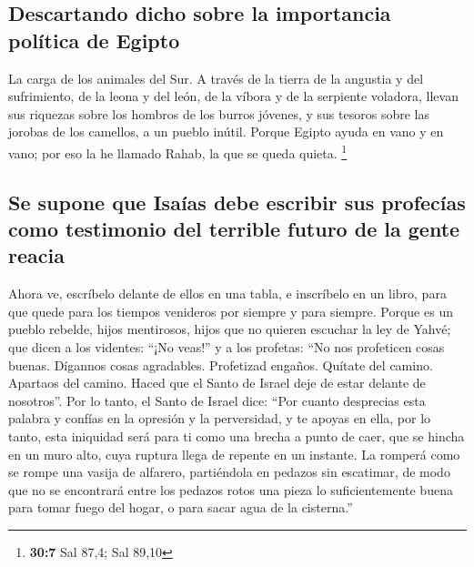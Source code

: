 \begin{paracol}{2}
\hypertarget{descartando-dicho-sobre-la-importancia-poluxedtica-de-egipto}{%
\subsection{Descartando dicho sobre la importancia política de
Egipto}\label{descartando-dicho-sobre-la-importancia-poluxedtica-de-egipto}}

 La carga de los animales del Sur. A través de la tierra
de la angustia y del sufrimiento, de la leona y del león, de la víbora y
de la serpiente voladora, llevan sus riquezas sobre los hombros de los
burros jóvenes, y sus tesoros sobre las jorobas de los camellos, a un
pueblo inútil.  Porque Egipto ayuda en vano y en vano; por
eso la he llamado Rahab, la que se queda quieta. \footnote{\textbf{30:7}
  Sal 87,4; Sal 89,10}

\hypertarget{se-supone-que-isauxedas-debe-escribir-sus-profecuxedas-como-testimonio-del-terrible-futuro-de-la-gente-reacia}{%
\subsection{Se supone que Isaías debe escribir sus profecías como
testimonio del terrible futuro de la gente
reacia}\label{se-supone-que-isauxedas-debe-escribir-sus-profecuxedas-como-testimonio-del-terrible-futuro-de-la-gente-reacia}}

 Ahora ve, escríbelo delante de ellos en una tabla, e
inscríbelo en un libro, para que quede para los tiempos venideros por
siempre y para siempre.  Porque es un pueblo rebelde,
hijos mentirosos, hijos que no quieren escuchar la ley de Yahvé;
 que dicen a los videntes: ``¡No veas!'' y a los
profetas: ``No nos profeticen cosas buenas. Dígannos cosas agradables.
Profetizad engaños.  Quítate del camino. Apartaos del
camino. Haced que el Santo de Israel deje de estar delante de
nosotros''.  Por lo tanto, el Santo de Israel dice: ``Por
cuanto desprecias esta palabra y confías en la opresión y la
perversidad, y te apoyas en ella,  por lo tanto, esta
iniquidad será para ti como una brecha a punto de caer, que se hincha en
un muro alto, cuya ruptura llega de repente en un instante.
 La romperá como se rompe una vasija de alfarero,
partiéndola en pedazos sin escatimar, de modo que no se encontrará entre
los pedazos rotos una pieza lo suficientemente buena para tomar fuego
del hogar, o para sacar agua de la cisterna.''


\end{paracol}
